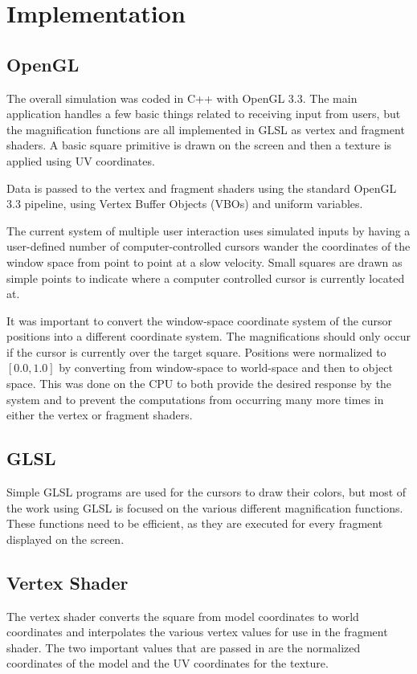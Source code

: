\documentclass[annual]{acmsiggraph}
\begin{document}
\section{Implementation}
\subsection{OpenGL}
The overall simulation was coded in C++ with OpenGL 3.3. The main application
handles a few basic things related to receiving input from users, but the 
magnification functions are all implemented in GLSL as vertex and fragment
shaders. A basic square primitive is drawn on the screen and then a texture
is applied using UV coordinates. 

Data is passed to the vertex and fragment shaders using the standard OpenGL 3.3
pipeline, using Vertex Buffer Objects (VBOs) and uniform variables. 

The current system of multiple user interaction uses simulated inputs by
having a user-defined number of computer-controlled cursors wander the 
coordinates of the window space from point to point at a slow velocity.
Small squares are drawn as simple points to indicate where a computer
controlled cursor is currently located at.

It was important to convert the window-space coordinate system of the cursor
positions into a different coordinate system. The magnifications should only occur
if the cursor is currently over the target square. Positions were normalized
to $[0.0,1.0]$ by converting from window-space to world-space and then to 
object space. This was done on the CPU to both provide the desired response 
by the system and to prevent the computations from occurring many more times
in either the vertex or fragment shaders.

\subsection{GLSL}
Simple GLSL programs are used for the cursors to draw their colors, but most
of the work using GLSL is focused on the various different magnification
functions. These functions need to be efficient, as they are executed for every
fragment displayed on the screen.

\subsection{Vertex Shader}
The vertex shader converts the square from model coordinates to world coordinates
and interpolates the various vertex values for use in the fragment shader. 
The two important values that are passed in are the normalized coordinates of
the model and the UV coordinates for the texture. 
\end{document}
